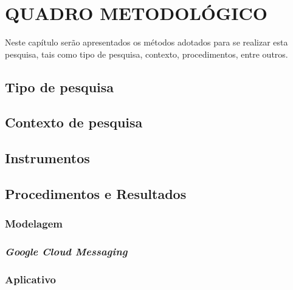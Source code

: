 \chapter{QUADRO METODOLÓGICO}

	\par Neste capítulo serão apresentados os métodos adotados para se realizar
	esta pesquisa, tais como tipo de pesquisa, contexto, procedimentos, entre outros.
	
	\section{Tipo de pesquisa}
		
	
	\section{Contexto de pesquisa}
		
	
	\section{Instrumentos}
		
	
	\section{Procedimentos e Resultados}
		
	
			\subsection{Modelagem}
				
	
			\subsection{\textit{Google Cloud Messaging}}
				
	
			\subsection{Aplicativo}
				
	
